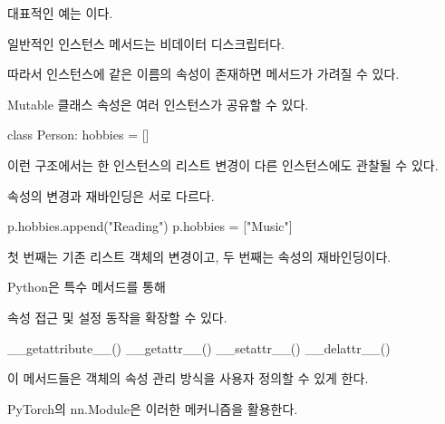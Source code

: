 대표적인 예는 이다.

\begin{dhknote}
\begin{dhksmry}[centered]
일반적인 인스턴스 메서드는 비데이터 디스크립터다.
\end{dhksmry}
\end{dhknote}

따라서 인스턴스에 같은 이름의 속성이 존재하면 메서드가 가려질 수 있다.

\begin{dhknote}
\begin{dhksmry}[centered]
Mutable 클래스 속성은 여러 인스턴스가 공유할 수 있다.
\end{dhksmry}
\end{dhknote}

\begin{dhkcode}
class Person:
    hobbies = []
\end{dhkcode}

이런 구조에서는 한 인스턴스의 리스트 변경이 다른 인스턴스에도 관찰될 수 있다.

\begin{dhknote}
\begin{dhksmry}[centered]
속성의 변경과 재바인딩은 서로 다르다.
\end{dhksmry}
\end{dhknote}

\begin{dhkcode}
p.hobbies.append("Reading")
p.hobbies = ["Music"]
\end{dhkcode}

첫 번째는 기존 리스트 객체의 변경이고, 두 번째는 속성의 재바인딩이다.

\begin{dhknote}
\begin{dhksmry}[centered]
Python은 특수 메서드를 통해 

속성 접근 및 설정 동작을 확장할 수 있다.
\end{dhksmry}
\end{dhknote}

\begin{dhkcode}
__getattribute__()
__getattr__()
__setattr__()
__delattr__()
\end{dhkcode}

이 메서드들은 객체의 속성 관리 방식을 사용자 정의할 수 있게 한다.

\begin{dhknote}
\begin{dhksmry}[centered]
PyTorch의 nn.Module은 이러한 메커니즘을 활용한다.
\end{dhksmry}
\end{dhknote}

